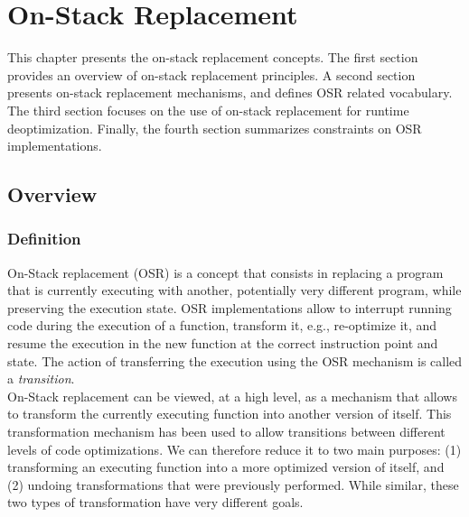 
\chapter{On-Stack Replacement} %

\label{Chapter2} %


\newcommand{\keyword}[1]{\textbf{#1}}
\newcommand{\tabhead}[1]{\textbf{#1}}
\newcommand{\code}[1]{\texttt{#1}}
\newcommand{\file}[1]{\texttt{\bfseries#1}}
\newcommand{\option}[1]{\texttt{\itshape#1}}

This chapter presents the on-stack replacement concepts.
The first section provides an overview of on-stack replacement principles.
A second section presents on-stack replacement mechanisms, and defines OSR related vocabulary.
The third section focuses on the use of on-stack replacement for runtime deoptimization.
Finally, the fourth section summarizes constraints on OSR implementations.\\

\section{Overview}
\subsection{Definition}

On-Stack replacement (OSR) is a concept that consists in replacing a program that is currently executing with another, potentially very different program, while preserving the execution state.
OSR implementations allow to interrupt running code during the execution of a function, transform it, e.g., re-optimize it, and resume the execution in the new function at the correct instruction point and state.
The action of transferring the execution using the OSR mechanism is called a \textit{transition}.\\

On-Stack replacement can be viewed, at a high level, as a mechanism that allows to transform the currently executing function into another version of itself.
This transformation mechanism has been used to allow transitions between different levels of code optimizations.
We can therefore reduce it to two main purposes: (1) transforming an executing function into a more optimized version of itself, and (2) undoing transformations that were previously performed.
While similar, these two types of transformation have very different goals.\\

